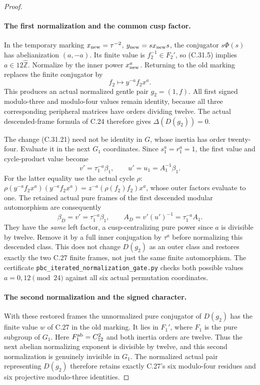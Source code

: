 \begin{proof}
\paragraph{The first normalization and the common cusp factor.}
In the temporary marking $x_{\rm new}=\tau^{-2}$,
$y_{\rm new}=s x_{\rm new}s$, the conjugator
$s\Phi(s)$ has abelianization $(a,-a)$. Its finite value is
$f_2^{-1}\in F_2'$, so (C.31.5) implies
$a\in12\widehat{\mathbb Z}$. Normalize by the inner power
$x_{\rm new}^a$. Returning to the old marking replaces the finite
conjugator by
\[
                         f_2\longmapsto y^{-a}f_2x^a.
 \tag{C.31.21}
\]
This produces an actual normalized gentle pair $g_2=(1,f)$.
All first signed modulo-three and modulo-four values remain identity,
because all three corresponding peripheral matrices have orders
dividing twelve. The actual descended-frame formula of C.24
therefore gives $\Delta(D(g_2))=0$.

The change (C.31.21) need not be identity in $G$, whose inertia
has order twenty-four. Evaluate it in the next $G_1$ coordinates.
Since $s_1^a=r_1^a=1$, the first value and cycle-product value become
\[
       v'=\tau_1^{-a}\beta_1,\qquad
       u'=u_1=A_1^{-1}\beta_1.
 \tag{C.31.22}
\]
For the latter equality use the actual cycle $\rho$:
$\rho(y^{-a}f_2x^a)(y^{-a}f_2x^a)
=z^{-a}(\rho(f_2)f_2)x^a$, whose outer factors evaluate to one.
The retained actual pure frames of the first descended modular
automorphism are consequently
\[
              \beta_D=v'=\tau_1^{-a}\beta_1,\qquad
              A_D=v'(u')^{-1}=\tau_1^{-a}A_1.
 \tag{C.31.23}
\]
They have the \emph{same} left factor, a cusp-centralizing pure
power since $a$ is divisible by twelve. Remove it by a full inner
conjugation by $\tau^a$ before normalizing this descended class.
This does not change $D(g_2)$ as an outer class and restores exactly
the two C.27 finite frames, not just the same finite automorphism.
The certificate \texttt{pbc\_iterated\_normalization\_gate.py}
checks both possible values $a=0,12\pmod{24}$ against all six
actual permutation coordinates.

\paragraph{The second normalization and the signed character.}
With these restored frames the unnormalized pure conjugator of
$D(g_2)$ has the finite value $w$ of C.27 in the old marking.
It lies in $F_1'$, where $F_1$ is the pure subgroup of $G_1$.
Here $F_1^{\rm ab}=C_{12}^2$ and both inertia orders are twelve.
Thus the next abelian normalizing exponent is divisible by twelve,
and this second normalization is genuinely invisible in $G_1$.
The normalized actual pair representing $D(g_2)$ therefore retains
exactly C.27's six modulo-four residues and six projective
modulo-three identities.


\end{proof}

